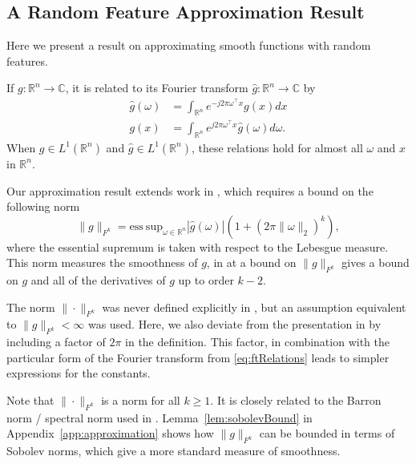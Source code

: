 \documentclass[twoside]{article}
\theoremstyle{definition}
\newcommand{\R}{\mathbb{R}}
\newcommand{\C}{\mathbb{C}}
\newcommand{\1}[1]{\scalebox{1.25}{$\mathds{1}$}\left[#1\right]}
\begin{document}
\subsection{A Random Feature Approximation Result}
\label{ss:approximation}
Here we present a result on approximating smooth functions with random features. 

If $g:\R^n \to \C$, it is related to its Fourier transform $\hat g:\R^n\to \C$ by
\begin{subequations}
\label{eq:ftRelations}
\begin{align}
  \label{eq:ft}
  \hat g(\omega)&=\int_{\R^n}e^{-j2\pi \omega^\top x} g(x)dx\\
  \label{eq:ift}
  g(x)&=\int_{\R^n}e^{j2\pi \omega^\top x}\hat g(\omega)d\omega.
\end{align}
\end{subequations}
When $g\in L^1(\R^n)$ and $\hat g \in L^1(\R^n)$, these relations hold for almost all $\omega$ and $x$  in $ \R^n$.

Our approximation result extends work in \cite{lamperski2024approximation,lamperski2024functiongradientapproximationrandom}, which requires a bound on the following norm
\begin{equation}
\label{eq:Fnorm}
\|g\|_{F^{k}}=\mathrm{ess\:sup}_{\omega\in\R^n}|\hat g(\omega)|\left(1+(2\pi\|\omega\|_2)^k\right),
\end{equation}
where the essential supremum is taken with respect to the Lebesgue measure. This norm measures the smoothness of $g$, in at a bound on $\|g\|_{F^k}$ gives  a bound on $g$ and all of the derivatives of $g$ up to order $k-2$. 

The norm $\|\cdot\|_{F^k}$ was never defined explicitly in \cite{lamperski2024approximation,lamperski2024functiongradientapproximationrandom}, but an assumption equivalent to $\|g\|_{F^{k}}<\infty$ was used. Here, we also deviate  from the presentation in \cite{lamperski2024approximation,lamperski2024functiongradientapproximationrandom} by including a factor of $2\pi$ in the definition. This factor, in combination with the particular form of the Fourier  transform from \eqref{eq:ftRelations} leads to simpler expressions for the constants.

Note that $\|\cdot \|_{F^k}$ is a norm for  all $k\ge 1$. It is closely related to the Barron norm / spectral norm used in \cite{klusowski2016risk,barron1993universal}. Lemma~\ref{lem:sobolevBound} in Appendix~\ref{app:approximation} shows how $\|g\|_{F^k}$ can be bounded in terms of Sobolev norms, which give a more standard measure of smoothness.
\end{document}

